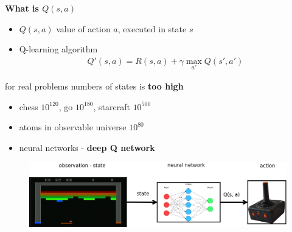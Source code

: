 \documentclass[xcolor=dvipsnames]{beamer}
\begin{document}
\begin{frame}{\bf What is $Q(s, a)$}

\begin{itemize}
    \item $Q(s, a)$ value of action $a$, executed in state $s$
    \item Q-learning algorithm
        \begin{align*}
        Q'(s, a) = R(s, a) + \gamma \max \limits_{a'} Q(s', a')
        \end{align*}
\end{itemize}

for real problems numbers of states is {\bf too high}
\begin{itemize}
    \item chess $10^{120}$, go $10^{180}$, starcraft $10^{500}$
    \item atoms in observable universe $10^{80}$
    \item neural networks - {\bf deep Q network}
\end{itemize}


\begin{figure}
  \includegraphics[scale=0.1]{../../diagrams/q_net.png}
\end{figure}


\end{frame}
\end{document}
